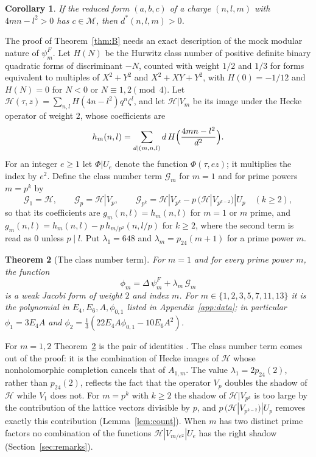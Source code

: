 \documentclass[11pt]{amsart}
\newtheorem{mainthm}{Theorem}
\newtheorem{maincor}[mainthm]{Corollary}
\theoremstyle{definition}
\newcommand{\pf}{p_{24}}
\newcommand{\dstar}{d^{*}}
\newcommand{\Hc}{\mathcal{H}}
\newcommand{\Mset}{\mathcal{M}}
\begin{document}
\begin{maincor}\label{cor:C}
If the reduced form $(a,b,c)$ of a charge $(n,l,m)$ with $4mn-l^2>0$ has $c\in\Mset$, then $\dstar(n,l,m)>0$.
\end{maincor}

The proof of Theorem~\ref{thm:B} needs an exact description of the mock modular nature of $\psi^F_m$. Let $H(N)$ be the Hurwitz class number of positive definite binary quadratic forms of discriminant $-N$, counted with weight $1/2$ and $1/3$ for forms equivalent to multiples of $X^2+Y^2$ and $X^2+XY+Y^2$, with $H(0)=-1/12$ and $H(N)=0$ for $N<0$ or $N\equiv1,2\pmod 4$. Let $\Hc(\tau,z)=\sum_{n,l}H(4n-l^2)q^n\zeta^l$, and let $\Hc|V_m$ be its image under the Hecke operator of weight $2$, whose coefficients are
\begin{equation}\label{eq:HVm}
h_m(n,l)=\sum_{d\mid(m,n,l)}d\,H\Bigl(\frac{4mn-l^2}{d^2}\Bigr).
\end{equation}
For an integer $e\ge1$ let $\Phi|U_e$ denote the function $\Phi(\tau,ez)$; it multiplies the index by $e^2$. Define the class number term $\mathcal G_m$ for $m=1$ and for prime powers $m=p^k$ by
\begin{equation}\label{eq:Gm}
\mathcal G_1=\Hc,\qquad \mathcal G_p=\Hc|V_p,\qquad \mathcal G_{p^k}=\Hc|V_{p^k}-p\,(\Hc|V_{p^{k-2}})|U_p\quad(k\ge2),
\end{equation}
so that its coefficients are $g_m(n,l)=h_m(n,l)$ for $m=1$ or $m$ prime, and $g_m(n,l)=h_m(n,l)-p\,h_{m/p^2}(n,l/p)$ for $k\ge2$, where the second term is read as $0$ unless $p\mid l$. Put $\lambda_1=648$ and $\lambda_m=\pf(m+1)$ for a prime power $m$.

\begin{mainthm}[The class number term]\label{thm:D}
For $m=1$ and for every prime power $m$, the function
\[
\phi_m=\Delta\,\psi^F_m+\lambda_m\,\mathcal G_m
\]
is a weak Jacobi form of weight $2$ and index $m$. For $m\in\{1,2,3,5,7,11,13\}$ it is the polynomial in $E_4,E_6,A,\phi_{0,1}$ listed in Appendix~\ref{app:data}; in particular $\phi_1=3E_4A$ and $\phi_2=\frac13(22E_4A\phi_{0,1}-10E_6A^2)$.
\end{mainthm}

For $m=1,2$ Theorem~\ref{thm:D} is the pair of identities \cite[(3.6), (3.7)]{BM13}. The class number term comes out of the proof: it is the combination of Hecke images of $\Hc$ whose nonholomorphic completion cancels that of $A_{1,m}$. The value $\lambda_1=2\pf(2)$, rather than $\pf(2)$, reflects the fact that the operator $V_p$ doubles the shadow of $\Hc$ while $V_1$ does not. For $m=p^k$ with $k\ge2$ the shadow of $\Hc|V_{p^k}$ is too large by the contribution of the lattice vectors divisible by $p$, and $p\,(\Hc|V_{p^{k-2}})|U_p$ removes exactly this contribution (Lemma~\ref{lem:count}). When $m$ has two distinct prime factors no combination of the functions $\Hc|V_{m/e^2}|U_e$ has the right shadow (Section~\ref{sec:remarks}).
\end{document}
